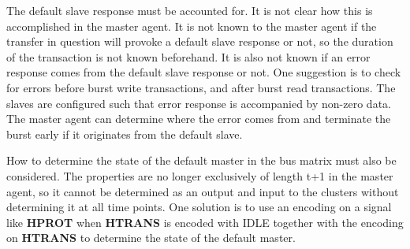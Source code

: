 The default slave response must be accounted for. It is not clear how this is accomplished in the master agent. It is not known to the master agent if the transfer in question will provoke a default slave response or not, so the duration of the transaction is not known beforehand. It is also not known if an error response comes from the default slave response or not. One suggestion is to check for errors before burst write transactions, and after burst read transactions. The slaves are configured such that error response is accompanied by non-zero data. The master agent can determine where the error comes from and terminate the burst early if it originates from the default slave. \par
How to determine the state of the default master in the bus matrix must also be considered. The properties are no longer exclusively of length t+1 in the master agent, so it cannot be determined as an output and input to the clusters without determining it at all time points. One solution is to use an encoding on a signal like \textbf{HPROT} when \textbf{HTRANS} is encoded with IDLE together with the encoding on \textbf{HTRANS} to determine the state of the default master.   


